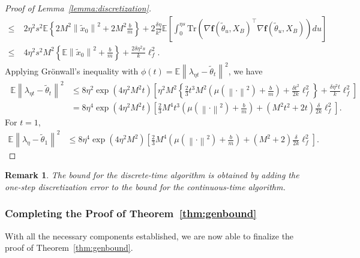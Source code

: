 \documentclass{article}
\newcommand{\norm}[1]{\left\lVert#1\right\rVert} %
\newtheorem{remark}{Remark}
\begin{document}
\begin{proof}[Proof of Lemma~\ref{lemma:discretization}]
\begin{align*}
		\leq&\; 2 \eta^2 s^2 \mathbb{E} \left\{2M^2 \norm{\tilde{x}_0}^2 + 2M^2\frac{b}{m}\right\} +  2 \frac{\delta \eta}{k^2} \mathbb{E} \left[\int_0^{\eta s} \mathrm{Tr} \left(\nabla \mathbf{f}(\tilde{\theta}_u, X_B)^\top  \nabla \mathbf{f}(\tilde{\theta}_u, X_B) \right) du\right]\\
		\leq&\; 4 \eta^2 s^2 M^2 \left\{ \mathbb{E}\norm{\tilde{x}_0}^2 + \frac{b}{m}\right\}  +  \frac{2 \delta \eta^2 s}{k} \ell_f^2.
	\end{align*}
	Applying Gr\"onwall's inequality with $\phi(t) = \mathbb{E}\norm{\lambda_{\eta t} - \tilde{\theta}_t}^2$, we have
	\begin{align*}
		\;\mathbb{E}{\norm{\lambda_{\eta t} - \tilde{\theta}_t}}^2 &\leq 
		8 \eta^2  \exp \left(4 \eta^2 M^2 t \right) \left[  \eta^2 M^2 \left\{\frac{2}{3} t^3 M^2 \left( \mu(\norm{\cdot}^2) + \frac{b}{m}\right)  +  \frac{ \delta t^2 }{2k} \ell_f^2\right\}  + \frac{\delta \eta^2 t}{k} \ell_f^2\right] \\
		& = 8 \eta^4  \exp \left(4 \eta^2 M^2 t \right) \left[  \frac{2}{3}  M^4  t^3 \left( \mu(\norm{\cdot}^2) + \frac{b}{m}\right)   + (  M^2 t^2+ 2  t)\frac{\delta }{2k} \ell_f^2\right] .
	\end{align*}
	For $t = 1$, 
	\begin{align*}
		\mathbb{E}\norm{\lambda_\eta - \tilde{\theta}_1}^2 &\leq 
		8\eta^4  \exp \left( 4 \eta^2 M^2 \right) \left[  \frac{2}{3} M^4 \left( \mu(\norm{\cdot}^2) + \frac{b}{m}\right)   + ( M^2 +2)\frac{\delta  }{2k} \ell_f^2\right] .
	\end{align*}
\end{proof}

\begin{remark}
	The bound for the discrete-time algorithm is obtained by adding the one-step discretization error to the bound for the continuous-time algorithm.
\end{remark}


\subsubsection{Completing the Proof of Theorem~\ref{thm:genbound}}\label{sec:complete}

With all the necessary components established, we are now able to finalize the proof of Theorem~\ref{thm:genbound}.
\end{document}
